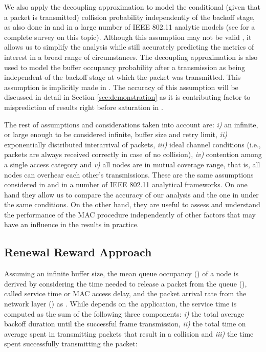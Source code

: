 \documentclass[preprint,12pt]{elsarticle}
\begin{document}
We also apply the decoupling approximation to model the conditional (given that a packet is transmitted) collision probability independently of the backoff stage, as also done in \cite{chung2006performance} and in a large number of IEEE 802.11 analytic models (see \cite{Duffy2010} for a complete survey on this topic). Although this assumption may not be valid \cite{Huang2010}, it allows us to simplify the analysis while still accurately predicting the metrics of interest in a broad range of circumstances. The decoupling approximation is also used to model the buffer occupancy probability after a transmission as being independent of the backoff stage at which the packet was transmitted. This assumption is implicitly made in \cite{chung2006performance}. The accuracy of this assumption will be discussed in detail in Section \ref{sec:demonstration} as it is contributing factor to misprediction of results right before saturation in \cite{chung2006performance}.

The rest of assumptions and considerations taken into account are: \emph{i)} an infinite, or large enough to be considered infinite, buffer size and retry limit, \emph{ii)} exponentially distributed interarrival of packets, \emph{iii)} ideal channel conditions (i.e., packets are always received correctly in case of no collision), \emph{iv)} contention among a single access category and \emph{v)} all nodes are in mutual coverage range, that is, all nodes can overhear each other's transmissions. These are the same assumptions considered in \cite{chung2006performance} and in a number of IEEE 802.11 analytical frameworks. On one hand they allow us to compare the accuracy of our analysis and the one in \cite{chung2006performance} under the same conditions. On the other hand, they are useful to assess and understand the performance of the MAC procedure independently of other factors that may have an influence in the results in practice.

\subsection{Renewal Reward Approach}

Assuming an infinite buffer size, the mean queue occupancy () of a node is derived by considering the time needed to release a packet from the queue (), called service time or MAC access delay, and the packet arrival rate from the network layer () as . While  depends on the application, the service time is computed as the sum of the following three components: \emph{i)} the total average backoff duration until the successful frame transmission, \emph{ii)} the total time on average spent in transmitting packets that result in a collision and \emph{iii)} the time spent successfully transmitting the packet:
\end{document}
